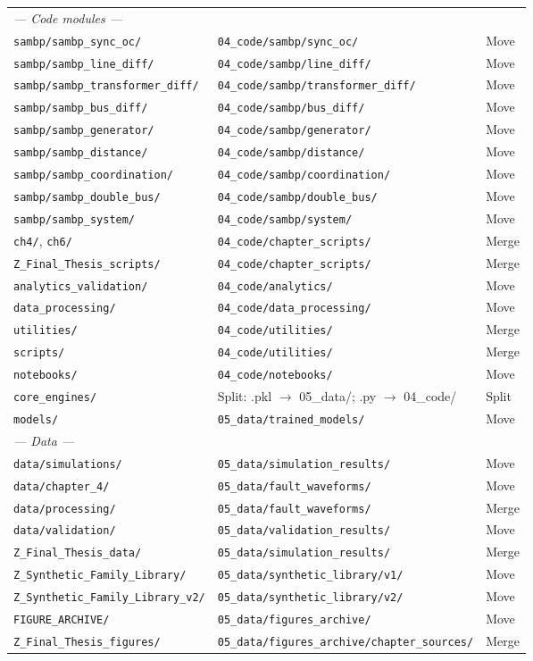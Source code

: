 \documentclass[11pt,a4paper]{article}
\newcommand{\cmd}[1]{\texttt{\small #1}}
\begin{document}
\begin{longtable}{p{5.2cm}p{6.8cm}l}
\multicolumn{3}{l}{\textit{--- Code modules ---}} \\
\cmd{sambp/sambp\_sync\_oc/} & \cmd{04\_code/sambp/sync\_oc/} & Move \\
\cmd{sambp/sambp\_line\_diff/} & \cmd{04\_code/sambp/line\_diff/} & Move \\
\cmd{sambp/sambp\_transformer\_diff/} & \cmd{04\_code/sambp/transformer\_diff/} & Move \\
\cmd{sambp/sambp\_bus\_diff/} & \cmd{04\_code/sambp/bus\_diff/} & Move \\
\cmd{sambp/sambp\_generator/} & \cmd{04\_code/sambp/generator/} & Move \\
\cmd{sambp/sambp\_distance/} & \cmd{04\_code/sambp/distance/} & Move \\
\cmd{sambp/sambp\_coordination/} & \cmd{04\_code/sambp/coordination/} & Move \\
\cmd{sambp/sambp\_double\_bus/} & \cmd{04\_code/sambp/double\_bus/} & Move \\
\cmd{sambp/sambp\_system/} & \cmd{04\_code/sambp/system/} & Move \\
\cmd{ch4/}, \cmd{ch6/} & \cmd{04\_code/chapter\_scripts/} & Merge \\
\cmd{Z\_Final\_Thesis\_scripts/} & \cmd{04\_code/chapter\_scripts/} & Merge \\
\cmd{analytics\_validation/} & \cmd{04\_code/analytics/} & Move \\
\cmd{data\_processing/} & \cmd{04\_code/data\_processing/} & Move \\
\cmd{utilities/} & \cmd{04\_code/utilities/} & Merge \\
\cmd{scripts/} & \cmd{04\_code/utilities/} & Merge \\
\cmd{notebooks/} & \cmd{04\_code/notebooks/} & Move \\
\cmd{core\_engines/} & Split: .pkl $\to$ 05\_data/; .py $\to$ 04\_code/ & Split \\
\cmd{models/} & \cmd{05\_data/trained\_models/} & Move \\[4pt]

\multicolumn{3}{l}{\textit{--- Data ---}} \\
\cmd{data/simulations/} & \cmd{05\_data/simulation\_results/} & Move \\
\cmd{data/chapter\_4/} & \cmd{05\_data/fault\_waveforms/} & Move \\
\cmd{data/processing/} & \cmd{05\_data/fault\_waveforms/} & Merge \\
\cmd{data/validation/} & \cmd{05\_data/validation\_results/} & Move \\
\cmd{Z\_Final\_Thesis\_data/} & \cmd{05\_data/simulation\_results/} & Merge \\
\cmd{Z\_Synthetic\_Family\_Library/} & \cmd{05\_data/synthetic\_library/v1/} & Move \\
\cmd{Z\_Synthetic\_Family\_Library\_v2/} & \cmd{05\_data/synthetic\_library/v2/} & Move \\
\cmd{FIGURE\_ARCHIVE/} & \cmd{05\_data/figures\_archive/} & Move \\
\cmd{Z\_Final\_Thesis\_figures/} & \cmd{05\_data/figures\_archive/chapter\_sources/} & Merge \\[4pt]


\end{longtable}
\end{document}
